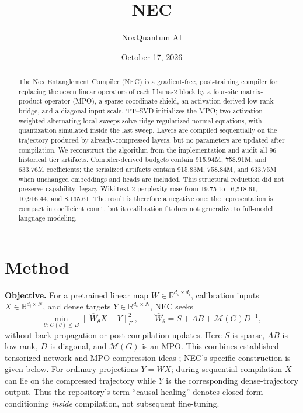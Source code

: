 \documentclass[10pt,twocolumn]{article}
\title{\vspace{-1.4em}\textbf{NEC}\vspace{-0.6em}}
\author{NoxQuantum AI}
\date{October 17, 2026}
\newcommand{\R}{\mathbb{R}}
\newcommand{\M}{\mathcal{M}}
\begin{document}
\maketitle
\vspace{-1.5em}
\fontsize{9}{9.7}\selectfont

\begin{abstract}
The Nox Entanglement Compiler (NEC) is a gradient-free, post-training compiler for replacing the seven linear operators of each Llama-2 block by a four-site matrix-product operator (MPO), a sparse coordinate shield, an activation-derived low-rank bridge, and a diagonal input scale.  TT--SVD initializes the MPO; two activation-weighted alternating local sweeps solve ridge-regularized normal equations, with quantization simulated inside the last sweep.  Layers are compiled sequentially on the trajectory produced by already-compressed layers, but no parameters are updated after compilation.  We reconstruct the algorithm from the implementation and audit all 96 historical tier artifacts.  Compiler-derived budgets contain 915.94M, 758.91M, and 633.76M coefficients; the serialized artifacts contain 915.83M, 758.84M, and 633.75M when unchanged embeddings and heads are included.  This structural reduction did not preserve capability: legacy WikiText-2 perplexity rose from 19.75 to 16,518.61, 10,916.44, and 8,135.61.  The result is therefore a negative one: the representation is compact in coefficient count, but its calibration fit does not generalize to full-model language modeling.
\end{abstract}

\section{Method}
\textbf{Objective.}
For a pretrained linear map $W\in\R^{d_o\times d_i}$, calibration inputs $X\in\R^{d_i\times N}$, and dense targets $Y\in\R^{d_o\times N}$, NEC seeks
\begin{equation}
 \min_{\theta:\,C(\theta)\le B}\|\widehat W_\theta X-Y\|_F^2,
 \qquad \widehat W_\theta=S+AB+\M(G)D^{-1},                 \label{eq:obj}
\end{equation}
without back-propagation or post-compilation updates.  Here $S$ is sparse, $AB$ is low rank, $D$ is diagonal, and $\M(G)$ is an MPO.  This combines established tensorized-network and MPO compression ideas \cite{novikov2015,compactifai}; NEC's specific construction is given below.  For ordinary projections $Y=WX$; during sequential compilation $X$ can lie on the compressed trajectory while $Y$ is the corresponding dense-trajectory output.  Thus the repository's term ``causal healing'' denotes closed-form conditioning \emph{inside} compilation, not subsequent fine-tuning.
\end{document}
